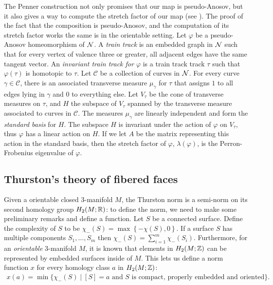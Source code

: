  The Penner construction not only promises that our map is pseudo-Anosov, but it also gives a way to
compute the stretch factor of our map (see \cite{penner1988construction}).  The proof of the fact
that the composition is pseudo-Anosov, and the computation of its stretch factor works the same is
in the orientable setting.  Let $\varphi$ be a pseudo-Anosov homeomorphism of $\mathcal{N}$.  A {\it train track} is an embedded graph in $\mathcal{N}$ such that for every vertex of valence three or greater, all adjacent edges have the same tangent vector.  An {\it invariant train track for $\varphi$} is a train track track $\tau$ such that $\varphi(\tau)$ is homotopic to $\tau$.  Let $\mathcal{C}$ be a collection of curves in $\mathcal{N}$. %
For every curve $\gamma \in\mathcal{C}$, there is an associated transverse measure
$\mu_\gamma$ for $\tau$ that assigns $1$ to all edges lying in $\gamma$ and 0 to everything else. Let $V_\tau$
be the cone of transverse measures on $\tau$, and $H$ the subspace of $V_\tau$ spanned by the
transverse measure associated to curves in $\mathcal{C}$.
The measures $\mu_\gamma$ are linearly independent and form the \textit{standard basis} for $H$. The subspace $H$ is invariant under the action of $\varphi$ on $V_\tau$, thus $\varphi$ has a linear action on $H$. If we let $A$
be the matrix representing this action in the standard basis, then the stretch factor of $\varphi$,
$\lambda(\varphi)$, is the Perron-Frobenius eigenvalue of $\varphi$.

\subsection{Thurston's theory of fibered faces}
\label{sec:thurst-fiber-face}

Given a orientable closed $3$-manifold $M$, the Thurston norm is a semi-norm on its second
homology group $H_2(M; \mathbb{R})$: to define the norm, we need to make some preliminary remarks and
define a function.  Let $S$ be a connected surface. Define the complexity of $S$ to be
$\chi_-(S) = \max\left\{-\chi(S),0\right\}$. If a surface $S$ has multiple components $S_1,\ldots,S_m$
then $\chi_-(S)=\displaystyle\sum_{i=1}^m\chi_-(S_i)$.  Furthermore, for an \emph{orientable}
3-manifold $M$, it is known that elements in $H_2(M ; \mathbb{Z})$ can be represented by embedded
surfaces inside of $M$. This lets us define a norm function $x$ for every homology class $a$
in $H_2(M; \mathbb{Z})$:
\begin{align*}
  x(a) = \min\{\chi_-(S) \mid [S] = a \text{ and $S$ is compact, properly embedded and oriented}\}.
\end{align*}

